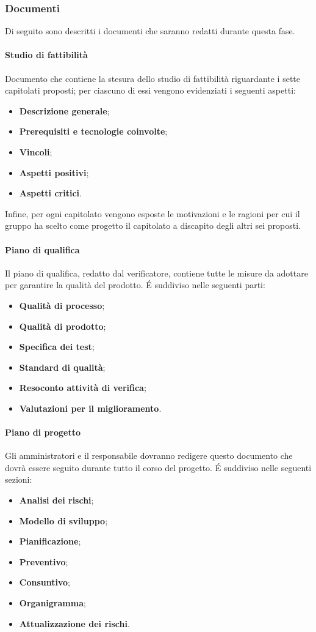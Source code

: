 \subsubsection{Documenti}
Di seguito sono descritti i documenti che saranno redatti durante questa fase.
\paragraph{Studio di fattibilità}
Documento che contiene la stesura dello studio di fattibilità riguardante i sette capitolati proposti; per ciascuno di essi vengono evidenziati i seguenti aspetti:
\begin{itemize}
    \item \textbf{Descrizione generale};
    \item \textbf{Prerequisiti e tecnologie coinvolte};
    \item \textbf{Vincoli};
    \item \textbf{Aspetti positivi};
    \item \textbf{Aspetti critici}.
\end{itemize}
Infine, per ogni capitolato vengono esposte le motivazioni e le ragioni per cui il gruppo ha scelto come progetto il capitolato \NomeProgetto{} a discapito degli altri sei proposti.\\
\paragraph{Piano di qualifica}
Il piano di qualifica, redatto dal verificatore, contiene tutte le misure da adottare per garantire la qualità del prodotto. \'E suddiviso nelle seguenti parti:
\begin{itemize}
\item \textbf{Qualità di processo};
\item \textbf{Qualità di prodotto};
\item \textbf{Specifica dei test};
\item \textbf{Standard di qualità};
\item \textbf{Resoconto attività di verifica};
\item \textbf{Valutazioni per il miglioramento}.
\end{itemize} 
\paragraph{Piano di progetto}
Gli amministratori e il responsabile dovranno redigere questo documento che dovrà essere seguito durante tutto il corso del progetto. \'E suddiviso nelle seguenti sezioni:
\begin{itemize}
    \item \textbf{Analisi dei rischi};
    \item \textbf{Modello di sviluppo};
    \item \textbf{Pianificazione};  
    \item \textbf{Preventivo};
    \item \textbf{Consuntivo};
    \item \textbf{Organigramma};
    \item \textbf{Attualizzazione dei rischi}. 
\end{itemize}
